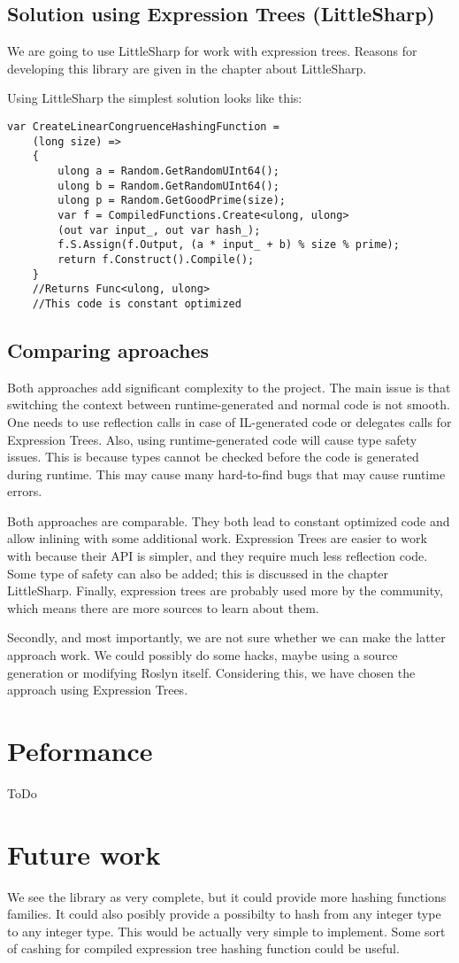 \subsection{Solution using Expression Trees (LittleSharp)}
We are going to use LittleSharp for work with expression trees. Reasons for developing this library are given in the chapter about LittleSharp.

Using LittleSharp the simplest solution looks like this:
\begin{lstlisting}
var CreateLinearCongruenceHashingFunction = 
    (long size) =>
    {
        ulong a = Random.GetRandomUInt64();
        ulong b = Random.GetRandomUInt64();
        ulong p = Random.GetGoodPrime(size);
        var f = CompiledFunctions.Create<ulong, ulong>
        (out var input_, out var hash_);
        f.S.Assign(f.Output, (a * input_ + b) % size % prime);
        return f.Construct().Compile();
    }
    //Returns Func<ulong, ulong>
    //This code is constant optimized
\end{lstlisting}

\subsection{Comparing aproaches}
Both approaches add significant complexity to the project. The main issue is that switching the context between runtime-generated and normal code is not smooth. One needs to use reflection calls in case of IL-generated code or delegates calls for Expression Trees. 
Also, using runtime-generated code will cause type safety issues. This is because types cannot be checked before the code is generated during runtime. This may cause many hard-to-find bugs that may cause runtime errors.

Both approaches are comparable. They both lead to constant optimized code and allow inlining with some additional work. Expression Trees are easier to work with because their API is simpler, and they require much less reflection code. Some type of safety can also be added; this is discussed in the chapter LittleSharp. Finally, expression trees are probably used more by the community, which means there are more sources to learn about them.

Secondly, and most importantly, we are not sure whether we can make the latter approach work. We could possibly do some hacks, maybe using a source generation or modifying Roslyn itself. Considering this, we have chosen the approach using Expression Trees. 
\section{Peformance}

ToDo 

\section{Future work}
We see the library as very complete, but it could provide more hashing functions families. It could also posibly  provide a possibilty to hash from any integer type to any integer type. This would be actually very simple to implement.
Some sort of cashing for compiled expression tree hashing function could be useful.

